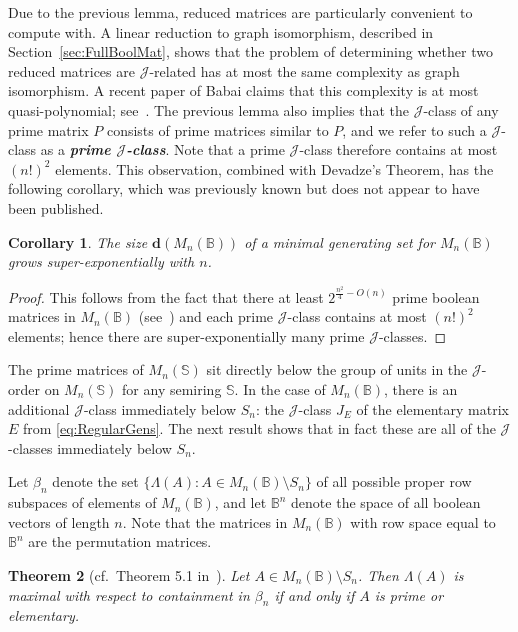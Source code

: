 \documentclass[11pt]{article}
\newtheorem{thm}{Theorem}[subsection]
\newtheorem{cor}[thm]{Corollary}
\newcommand{\defn}[1]{\textbf{\textit{#1}}}
\numberwithin{equation}{section}
\newcommand{\set}[2]{\ensuremath{\{#1 : #2 \}}}
\newcommand{\B}{\mathbb{B}}
\newcommand{\Bn}{M_n(\B)}
\newcommand{\J}{\mathscr{J}}
\newcommand{\RowS}{\Lambda}
\begin{document}
Due to the previous lemma, reduced matrices are particularly convenient to
compute with. A linear reduction to graph isomorphism, described in
Section~\ref{sec:FullBoolMat}, shows that the problem of determining whether two
reduced matrices are $\J$-related has at most the same complexity as graph
isomorphism.  A recent paper of Babai claims that this complexity is at most
quasi-polynomial; see~\cite{Babai2016aa}.
The previous lemma also implies that the $\J$-class of any prime matrix $P$
consists of prime matrices similar to $P$, and we refer to such a $\J$-class as
a \defn{prime $\J$-class}. Note that a prime $\J$-class therefore contains at
most $(n!)^2$ elements. This observation, combined with Devadze's Theorem, has
the following corollary, which was previously known but does not appear to have
been published.

\begin{cor}
  The size $\mathbf{d}(\Bn)$ of a minimal generating set for $\Bn$ grows
  super-exponentially with $n$.
\end{cor}
\begin{proof}
  This follows from the fact that there at least $2^{\frac{n^2}{4} - O(n)}$
  prime boolean matrices in $\Bn$ (see~\cite[Theorem 2.4.1]{Kim1982aa}) and each
  prime $\J$-class contains at most $(n!)^2$ elements; hence there are
  super-exponentially many prime $\J$-classes.
\end{proof}

The prime matrices of $M_n(\mathbb{S})$ sit directly below the group of units in
the $\J$-order on $M_n(\mathbb{S})$ for any semiring $\mathbb{S}$. In the case
of $\Bn$, there is an additional $\J$-class immediately below $S_n$: the
$\J$-class $J_E$ of the elementary matrix $E$ from \eqref{eq:RegularGens}. The
next result shows that in fact these are all of the $\J$-classes immediately
below $S_n$.

Let $\beta_n$ denote the set $\set{\RowS(A)}{A\in \Bn\setminus S_n}$ of all
possible proper row subspaces of elements of $\Bn$, and let $\B^n$ denote
the space of all boolean vectors of length $n$. Note that the matrices in $\Bn$ with row
space equal to $\B^n$ are the permutation matrices.

\begin{thm}[cf.\ Theorem 5.1 in~\cite{Caen1981aa}]
  Let $A \in \Bn\setminus S_n$. Then $\RowS(A)$ is maximal with respect to
  containment in $\beta_n$ if and only if $A$ is prime or elementary.  
\end{thm}
\end{document}
